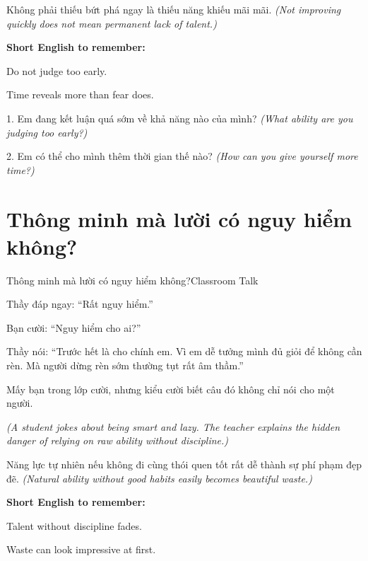 \begin{baihoc}
Không phải thiếu bứt phá ngay là thiếu năng khiếu mãi mãi.
\textit{(Not improving quickly does not mean permanent lack of talent.)}
\end{baihoc}

\begin{ghinhoanh}
\textbf{Short English to remember:}

Do not judge too early.

Time reveals more than fear does.
\end{ghinhoanh}

\begin{tuhocnhanh}
1. Em đang kết luận quá sớm về khả năng nào của mình? \textit{(What ability are you judging too early?)}

2. Em có thể cho mình thêm thời gian thế nào? \textit{(How can you give yourself more time?)}
\end{tuhocnhanh}
\ngancach

\section{Thông minh mà lười có nguy hiểm không?}
\begin{truyen}{Thông minh mà lười có nguy hiểm không?}{Classroom Talk}

Thầy đáp ngay: ``Rất nguy hiểm.''

Bạn cười: ``Nguy hiểm cho ai?''

Thầy nói: ``Trước hết là cho chính em. Vì em dễ tưởng mình đủ giỏi để không cần rèn. Mà người dừng rèn sớm thường tụt rất âm thầm.''

Mấy bạn trong lớp cười, nhưng kiểu cười biết câu đó không chỉ nói cho một người.

\textit{(A student jokes about being smart and lazy. The teacher explains the hidden danger of relying on raw ability without discipline.)}
\end{truyen}

\begin{baihoc}
Năng lực tự nhiên nếu không đi cùng thói quen tốt rất dễ thành sự phí phạm đẹp đẽ.
\textit{(Natural ability without good habits easily becomes beautiful waste.)}
\end{baihoc}

\begin{ghinhoanh}
\textbf{Short English to remember:}

Talent without discipline fades.

Waste can look impressive at first.
\end{ghinhoanh}

